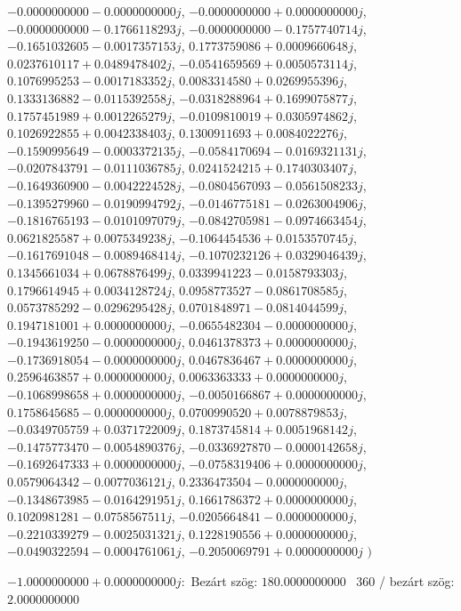 \documentclass[14pt,a4paper]{article}
\begin{document}
\begin{itemize}
$-0.0000000000-0.0000000000j$, $-0.0000000000+0.0000000000j$, $-0.0000000000-0.1766118293j$, $-0.0000000000-0.1757740714j$, $-0.1651032605-0.0017357153j$, $0.1773759086+0.0009660648j$, $0.0237610117+0.0489478402j$, $-0.0541659569+0.0050573114j$, $0.1076995253-0.0017183352j$, $0.0083314580+0.0269955396j$, $0.1333136882-0.0115392558j$, $-0.0318288964+0.1699075877j$, $0.1757451989+0.0012265279j$, $-0.0109810019+0.0305974862j$, $0.1026922855+0.0042338403j$, $0.1300911693+0.0084022276j$, $-0.1590995649-0.0003372135j$, $-0.0584170694-0.0169321131j$, $-0.0207843791-0.0111036785j$, $0.0241524215+0.1740303407j$, $-0.1649360900-0.0042224528j$, $-0.0804567093-0.0561508233j$, $-0.1395279960-0.0190994792j$, $-0.0146775181-0.0263004906j$, $-0.1816765193-0.0101097079j$, $-0.0842705981-0.0974663454j$, $0.0621825587+0.0075349238j$, $-0.1064454536+0.0153570745j$, $-0.1617691048-0.0089468414j$, $-0.1070232126+0.0329046439j$, $0.1345661034+0.0678876499j$, $0.0339941223-0.0158793303j$, $0.1796614945+0.0034128724j$, $0.0958773527-0.0861708585j$, $0.0573785292-0.0296295428j$, $0.0701848971-0.0814044599j$, $0.1947181001+0.0000000000j$, $-0.0655482304-0.0000000000j$, $-0.1943619250-0.0000000000j$, $0.0461378373+0.0000000000j$, $-0.1736918054-0.0000000000j$, $0.0467836467+0.0000000000j$, $0.2596463857+0.0000000000j$, $0.0063363333+0.0000000000j$, $-0.1068998658+0.0000000000j$, $-0.0050166867+0.0000000000j$, $0.1758645685-0.0000000000j$, $0.0700990520+0.0078879853j$, $-0.0349705759+0.0371722009j$, $0.1873745814+0.0051968142j$, $-0.1475773470-0.0054890376j$, $-0.0336927870-0.0000142658j$, $-0.1692647333+0.0000000000j$, $-0.0758319406+0.0000000000j$, $0.0579064342-0.0077036121j$, $0.2336473504-0.0000000000j$, $-0.1348673985-0.0164291951j$, $0.1661786372+0.0000000000j$, $0.1020981281-0.0758567511j$, $-0.0205664841-0.0000000000j$, $-0.2210339279-0.0025031321j$, $0.1228190556+0.0000000000j$, $-0.0490322594-0.0004761061j$, $-0.2050069791+0.0000000000j$
$\big)$
\end{itemize}
$-1.0000000000+0.0000000000j$:\
Bezárt szög: $180.0000000000$ \
360 / bezárt szög: $2.0000000000$\
\end{document}
